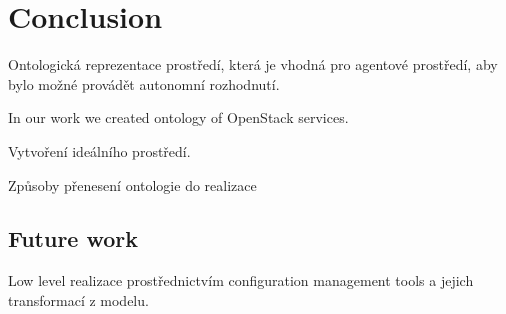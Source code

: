 
\section{Conclusion}

Ontologická reprezentace prostředí, která je vhodná pro agentové prostředí, aby bylo možné provádět autonomní rozhodnutí. 

In our work we created ontology of OpenStack services.

Vytvoření ideálního prostředí.

Způsoby přenesení ontologie do realizace

\subsection{Future work}

Low level realizace prostřednictvím configuration management tools a jejich transformací z modelu.